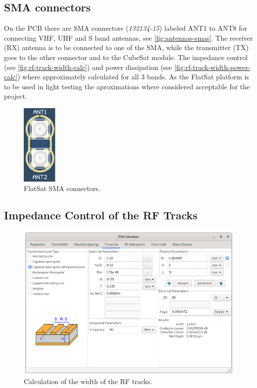 \subsection{SMA connectors}

On the PCB there are SMA connectors (\textit{132134-15}) labeled ANT1 to ANT8 for connecting VHF, UHF and S band antennas, see \autoref{fig:antennas-smas}. The receiver (RX) antenna is to be connected to one of the SMA, while the transmitter (TX) goes to the other connector and to the CubeSat module. The impedance control (see \autoref{fig:rf-track-width-calc}) and power dissipation (see \autoref{fig:rf-track-width-power-calc}) where approximately calculated for all 3 bands. As the FlatSat platform is to be used in light testing the aproximations where considered acceptable for the project.

\begin{figure}[!ht]
    \begin{center}
        \includegraphics[width=0.15\textwidth]{figures/antennas_smas.png}
        \caption{FlatSat SMA connectors.}
        \label{fig:antennas-smas}
    \end{center}
\end{figure}

\subsection{Impedance Control of the RF Tracks}

\begin{figure}[!ht]
    \begin{center}
        \includegraphics[width=\textwidth]{figures/rf-track-width.png}
        \caption{Calculation of the width of the RF tracks.}
        \label{fig:rf-track-width-calc}
    \end{center}
\end{figure}

